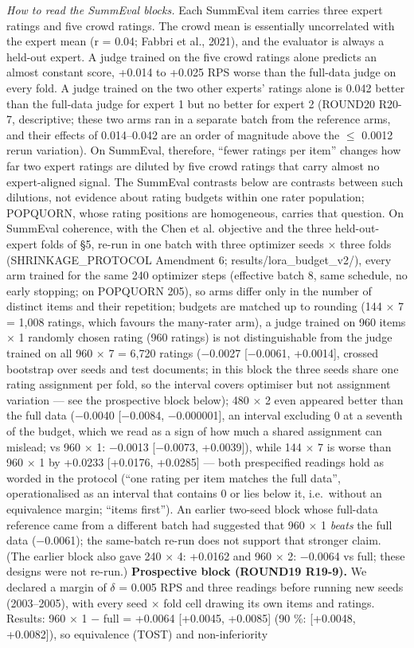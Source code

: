 \documentclass{article}
\begin{document}
\emph{How to read the SummEval blocks.} Each SummEval item carries three expert ratings and five crowd ratings. The crowd mean is essentially uncorrelated with the expert mean (r = 0.04; Fabbri et al., 2021), and the evaluator is always a held-out expert. A judge trained on the five crowd ratings alone predicts an almost constant score, +0.014 to +0.025 RPS worse than the full-data judge on every fold. A judge trained on the two other experts' ratings alone is 0.042 better than the full-data judge for expert 1 but no better for expert 2 (ROUND20 R20-7, descriptive; these two arms ran in a separate batch from the reference arms, and their effects of 0.014--0.042 are an order of magnitude above the $\leq$ 0.0012 rerun variation). On SummEval, therefore, ``fewer ratings per item'' changes how far two expert ratings are diluted by five crowd ratings that carry almost no expert-aligned signal. The SummEval contrasts below are contrasts between such dilutions, not evidence about rating budgets within one rater population; POPQUORN, whose rating positions are homogeneous, carries that question. On SummEval coherence, with the Chen et al. objective and the three held-out-expert folds of \S{}5, re-run in one batch with three optimizer seeds $\times$ three folds (SHRINKAGE\_PROTOCOL Amendment 6; results/lora\_budget\_v2/), every arm trained for the same 240 optimizer steps (effective batch 8, same schedule, no early stopping; on POPQUORN 205), so arms differ only in the number of distinct items and their repetition; budgets are matched up to rounding (144 $\times$ 7 = 1,008 ratings, which favours the many-rater arm), a judge trained on 960 items $\times$ 1 randomly chosen rating (960 ratings) is not distinguishable from the judge trained on all 960 $\times$ 7 = 6,720 ratings ($-$0.0027 {[}$-$0.0061, +0.0014{]}, crossed bootstrap over seeds and test documents; in this block the three seeds share one rating assignment per fold, so the interval covers optimiser but not assignment variation --- see the prospective block below); 480 $\times$ 2 even appeared better than the full data ($-$0.0040 {[}$-$0.0084, $-$0.000001{]}, an interval excluding 0 at a seventh of the budget, which we read as a sign of how much a shared assignment can mislead; vs 960 $\times$ 1: $-$0.0013 {[}$-$0.0073, +0.0039{]}), while 144 $\times$ 7 is worse than 960 $\times$ 1 by +0.0233 {[}+0.0176, +0.0285{]} --- both prespecified readings hold as worded in the protocol (``one rating per item matches the full data'', operationalised as an interval that contains 0 or lies below it, i.e.~without an equivalence margin; ``items first''). An earlier two-seed block whose full-data reference came from a different batch had suggested that 960 $\times$ 1 \emph{beats} the full data ($-$0.0061); the same-batch re-run does not support that stronger claim. (The earlier block also gave 240 $\times$ 4: +0.0162 and 960 $\times$ 2: $-$0.0064 vs full; these designs were not re-run.) \textbf{Prospective block (ROUND19 R19-9).} We declared a margin of $\delta$ = 0.005 RPS and three readings before running new seeds (2003--2005), with every seed $\times$ fold cell drawing its own items and ratings. Results: 960 $\times$ 1 $-$ full = +0.0064 {[}+0.0045, +0.0085{]} (90 \%: {[}+0.0048, +0.0082{]}), so equivalence (TOST) and non-inferiority 
\end{document}
